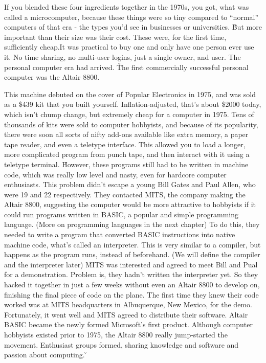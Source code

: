 If you blended these four ingredients together in the 1970s, you got, what was called a microcomputer, because these
things were so tiny compared to ``normal'' computers of that era - the types you'd see in businesses or universities.
\v

But more important than their size was their cost. These were, for the first time, sufficiently cheap.It was
practical to buy one and only have one person ever use it. No time sharing, no multi-user logins, just a single
owner, and user. The personal computer era had arrived.  \v

The first commercially successful personal computer was the Altair 8800.


This machine debuted on the cover of Popular Electronics in 1975, and was sold as a \$439 kit that you built yourself.
Inflation-adjusted, that's about \$2000 today, which isn't chump change, but extremely cheap for a computer in
1975. Tens of thousands of kits were sold to computer hobbyists, and because of its popularity, there were soon all
sorts of nifty add-ons available like extra memory, a paper tape reader, and even a teletype interface. This allowed
you to load a longer, more complicated program from punch tape, and then interact with it using a teletype terminal. \v

However, these programs still had to be written in machine code, which was really low level and nasty, even for
hardcore computer enthusiasts. This problem didn't escape a young Bill Gates and Paul Allen, who were 19 and 22
respectively. They contacted MITS, the company making the Altair 8800, suggesting the computer would be more
attractive to hobbyists if it could run programs written in BASIC, a popular and simple programming language. (More
on programming languages in the next chapter) To do this, they needed to write a program that converted BASIC
instructions into native machine code, what's called an interpreter. This is very similar to a compiler, but happens
as the program runs, instead of beforehand. (We will define the compiler and the interpreter later) \v

MITS was interested and agreed to meet Bill and Pual for a demonstration. Problem is, they hadn't written the
interpreter yet. So they hacked it together in just a few weeks without even an Altair 8800 to develop on, finishing
the final piece of code on the plane. The first time they knew their code worked was at MITS headquarters in Albuquerque, New Mexico, for the demo.
Fortunately, it went well and MITS agreed to distribute their software. Altair BASIC became the newly formed
Microsoft's first product. Although computer hobbyists existed prior to 1975, the Altair 8800 really jump-started the
movement. Enthusiast groups formed, sharing knowledge and software and passion about computing. \v

